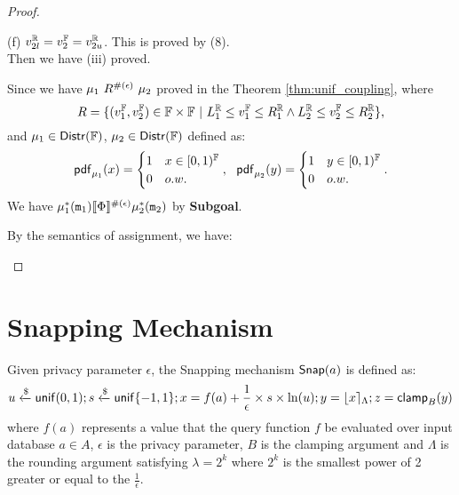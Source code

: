 \documentclass[a4paper,11pt]{article}
\begin{document}
\begin{proof}
\begin{itemize}
\begin{subproof}
	(f) $v^{\mathbb{R}}_{2l} = v^{\mathbb{F}}_2 = v^{\mathbb{R}}_{2u}$.
	This is proved by (8).
	\\
	Then we have (iii) proved. 
	\end{subproof}
	Since we have ${\mu_1} ~ R^{\#(\epsilon)} ~ {\mu_2}$ proved in the Theorem \ref{thm:unif_coupling},
	where 
	\[ R = 
			\{(v^{\mathbb{F}}_1, v^{\mathbb{F}}_2) \in \mathbb{F} \times \mathbb{F} 
			~|~
			L^{\mathbb{R}}_1 \leq v^{\mathbb{F}}_1 \leq R^{\mathbb{R}}_1 
			\land 
			L^{\mathbb{R}}_2 \leq v^{\mathbb{F}}_2 \leq R^{\mathbb{R}}_2
			\},
	\]
	and ${\mu_1} \in \mathsf{Distr}(\mathbb{F})$, ${\mu_2} \in \mathsf{Distr}(\mathbb{F})$ defined as:
	\[
		\mathsf{pdf}_{\mu_1}(x) = 
		\begin{cases}
		1 & x \in [0, 1)^{\mathbb{F}} 
		\\
		0       & o.w.
		\end{cases} ,
		~~
		\mathsf{pdf}_{\mu_2}(y) = 
		\begin{cases}
		1 & y \in [0, 1)^{\mathbb{F}}
		\\
		0       & o.w.
		\end{cases}.
	\]	
	We have $\mu^*_1(\mathtt{m}_1) \llbracket \Phi \rrbracket^{\#(\epsilon)} \mu^*_2(\mathtt{m}_2)$ by \textbf{Subgoal}.



	By the semantics of assignment, we have:\\
	\end{itemize}
\end{proof}


\newpage
\section{Snapping Mechanism}

\begin{defn}
Given privacy parameter $\epsilon$, the Snapping mechanism $\mathsf{Snap}(a)$ is defined as:
\[
	u \xleftarrow{\$} \mathsf{unif}(0,1); s \xleftarrow{\$} \mathsf{unif}\{-1, 1\};
	x = f(a) + \frac{1}{\epsilon} \times s \times \ln (u);
	y = \lfloor x \rceil_{\Lambda};
	z = \mathsf{clamp}_B (y)
\]
where $f(a)$ represents a value that the query function $f$ be evaluated over input database $a \in A$, $\epsilon$ is the privacy parameter, $B$ is the clamping argument and $\Lambda$ is the rounding argument satisfying $\lambda = 2^k$ where $2^k$ is the smallest power of 2 greater or equal to the $\frac{1}{\epsilon}$.
\end{defn}
\end{document}
